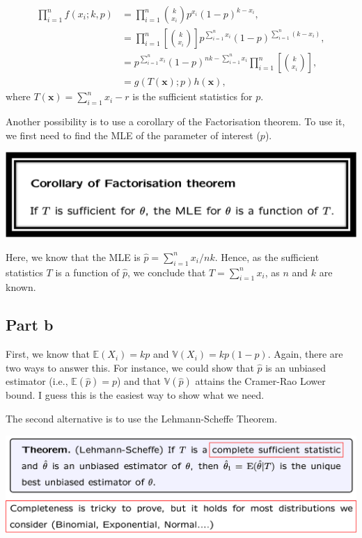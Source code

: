 \documentclass[12pt]{article}
\begin{document}
\begin{align}
\prod_{i=1}^{n} f(x_{i}; k, p) & = \prod_{i=1}^{n} {k \choose x_{i}}p^{x_{i}} (1-p)^{k-x_{i}}, \\
& = \prod_{i=1}^{n} \left[ {k \choose x_{i}} \right] p^{ \sum_{i=1}^{n} x_{i}} (1-p)^{\sum_{i=1}^{n} (k-x_{i})}, \\
& = p^{\sum_{i=1}^{n} x_{i}} (1-p)^{ nk- \sum_{i=1}^{n}x_{i}} \prod_{i=1}^{n} \left[ {k \choose x_{i}} \right], \\
& = g(T(\textbf{x}); p) h(\textbf{x}),
\end{align}
where $T(\textbf{x}) = \sum_{i=1}^{n} x_{i}-r$ is the sufficient statistics for $p$.

Another possibility is to use a corollary of the Factorisation theorem. To use it, we first need to find the MLE of the parameter of interest ($p$). 

\includegraphics[width=1\linewidth]{corollary_factorisation_theorem.png}

Here, we know that the MLE is $\hat{p} = \sum_{i=1}^{n}x_{i}/nk$. Hence, as the sufficient statistics $T$ is a function of $\hat{p}$, we conclude that $T = \sum_{i=1}^{n}x_{i}$, as $n$ and $k$ are known.

\subsection*{Part b}

First, we know that $\mathbb{E}(X_{i}) = kp$ and $\mathbb{V}(X_{i}) = kp(1-p)$. Again, there are two ways to answer this. For instance, we could show that $\hat{p}$ is an unbiased estimator (i.e., $\mathbb{E}(\hat{p})= p$) and that $\mathbb{V}(\hat{p})$ attains the Cramer-Rao Lower bound. I guess this is the easiest way to show what we need.

The second alternative is to use the Lehmann-Scheffe Theorem.

\includegraphics[width=1\linewidth]{Leman_theorem.png}
\end{document}
